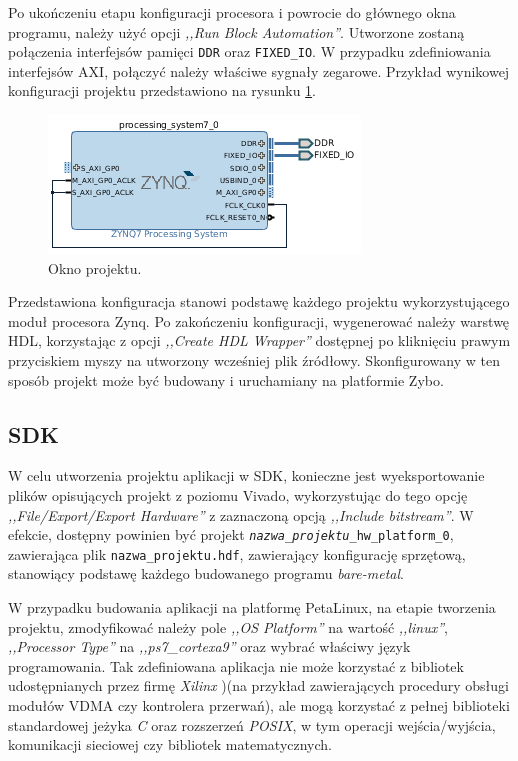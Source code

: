 Po ukończeniu etapu konfiguracji procesora i powrocie do głównego okna programu, należy użyć opcji \emph{,,Run Block Automation''}. 
Utworzone zostaną połączenia interfejsów pamięci \texttt{DDR} oraz \texttt{FIXED\_IO}.
W przypadku zdefiniowania interfejsów AXI, połączyć należy właściwe sygnały zegarowe. 
Przykład wynikowej konfiguracji projektu przedstawiono na rysunku \ref{fig:vivado-config-result}.

	\begin{figure}[ht]
		\centering
		\includegraphics[]{img/vivado/vivado-config-result.png}
		\caption{Okno projektu.}
		\label{fig:vivado-config-result}
	\end{figure}
	
Przedstawiona konfiguracja stanowi podstawę każdego projektu wykorzystującego moduł procesora Zynq.
Po zakończeniu konfiguracji, wygenerować należy warstwę HDL, korzystając z opcji \emph{,,Create HDL Wrapper''} dostępnej po kliknięciu prawym przyciskiem myszy na utworzony wcześniej plik źródłowy.
Skonfigurowany w ten sposób projekt może być budowany i uruchamiany na platformie Zybo.

\subsection{SDK}

W celu utworzenia projektu aplikacji w SDK, konieczne jest wyeksportowanie plików opisujących projekt z poziomu Vivado, wykorzystując do tego opcję \emph{,,File/Export/Export Hardware''} z zaznaczoną opcją \emph{,,Include bitstream''}.
W efekcie, dostępny powinien być projekt \texttt{\textit{nazwa\_projektu}\_hw\_platform\_0}, zawierająca plik \texttt{nazwa\_projektu.hdf}, zawierający konfigurację sprzętową, stanowiący podstawę każdego budowanego programu \textit{bare-metal}. 

W przypadku budowania aplikacji na platformę PetaLinux, na etapie tworzenia projektu, zmodyfikować należy pole \emph{,,OS Platform''} na wartość \emph{,,linux''}, \emph{,,Processor Type''} na \emph{,,ps7\_cortexa9''} oraz wybrać właściwy język programowania.
Tak zdefiniowana aplikacja nie może korzystać z bibliotek udostępnianych przez firmę \emph{Xilinx} )(na przykład zawierających procedury obsługi modułów VDMA czy kontrolera przerwań), ale mogą korzystać z pełnej biblioteki standardowej jeżyka \emph{C} oraz rozszerzeń \emph{POSIX}, w tym operacji wejścia/wyjścia, komunikacji sieciowej czy bibliotek matematycznych.


